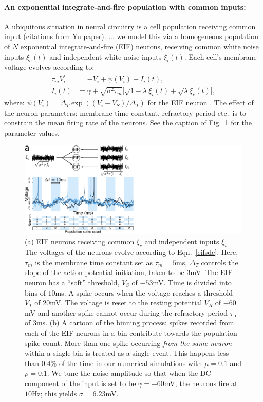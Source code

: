\documentclass[%
 reprint,
 twocolumn,
 amsmath,amssymb,
 aps,
floatfix,
]{revtex4}
\begin{document}
\paragraph*{An exponential integrate-and-fire population with common inputs:} A ubiquitous situation in neural circuitry is a cell population receiving common input (citations from Yu paper). ... we model this via a homogeneous population of $N$ exponential integrate-and-fire (EIF) neurons, receiving common white noise inputs $\xi_c(t)$ and independent white noise inputs $\xi_i(t)$.  Each cell's membrane voltage evolves according to: 
\begin{align}
\label{eifsde}
\tau_m V_i^\prime &= -V_i +\psi(V_i)+I_i(t),\\
I_i(t) &= \gamma+\sqrt{\sigma^2\tau_m}\big[\sqrt{1-\lambda}\xi_i(t)+\sqrt{\lambda}\xi_c(t)\big] \nonumber,
\end{align}
where: $\psi(V_i) =\Delta_T \exp{\left((V_i - V_S)/\Delta_T\right)}$ for the EIF neuron \cite{Fourcard-Troume, Abbott-Dayan}. The effect of the neuron parameters: membrane time constant, refractory period etc.~is to constrain the mean firing rate of the neurons. See the caption of Fig.~\ref{fig:schematic} for the parameter values.

\begin{figure}[t!]
\includegraphics{figures/EIF_schematic}
\caption{\label{fig:schematic} (a) EIF neurons receiving common $\xi_c$ and independent inputs $\xi_i$. The voltages of the neurons evolve according to Eqn.~\eqref{eifsde}. Here, $\tau_m$ is the membrane time constant set as $\tau_m = 5$ms, $\Delta_T$ controls the slope of the action potential initiation, taken to be $3$mV. The EIF neuron has a ``soft'' threshold, $V_S$ of $-53$mV. Time is divided into bins of $10$ms. A spike occurs when the voltage reaches a threshold $V_T$ of $20$mV. The voltage is reset to the resting potential $V_R$ of $-60$mV and another spike cannot occur during the refractory period $\tau_{\text{ref}}$ of $3$ms. (b) A cartoon of the binning process: spikes recorded from each of the EIF neurons in a bin contribute towards the population spike count. More than one spike occurring {\em from the same neuron} within a single bin is treated as a single event. This happens less than $0.4\%$ of the time in our numerical simulations with $\mu=0.1$ and $\rho=0.1$. We tune the noise amplitude so that when the DC component of the input is set to be $\gamma = -60$mV, the neurons fire at $10$Hz; this yields $\sigma = 6.23$mV.
}
\end{figure}
\end{document}
